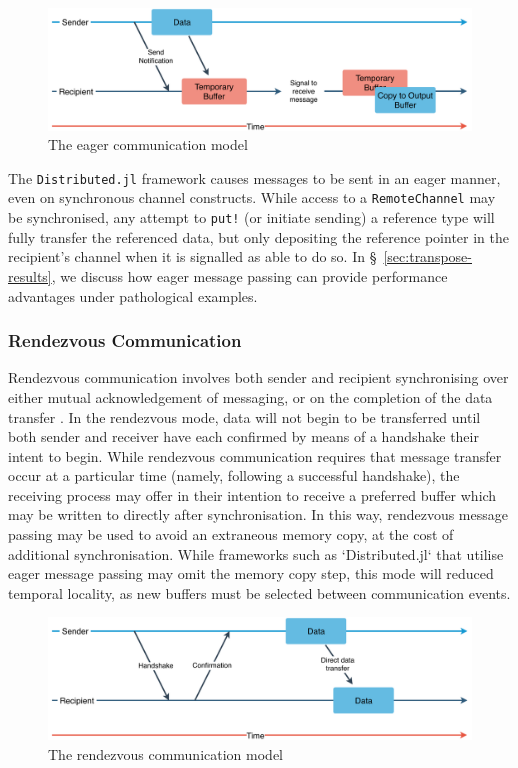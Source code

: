 \begin{figure}[htb]
  \includegraphics[width=\linewidth]{figs/Eager.pdf}
  \caption{The eager communication model}
  \label{fig:eager}
\end{figure}

The \texttt{Distributed.jl} framework causes messages to be sent in an
eager manner, even on synchronous channel constructs. While access to a
\texttt{RemoteChannel} may be synchronised, any attempt to \texttt{put!}
(or initiate sending) a reference type will fully transfer the
referenced data, but only depositing the reference pointer in the
recipient's channel when it is signalled as able to do so. In
\S~\ref{sec:transpose-results}, we discuss how eager message
passing can provide performance advantages under pathological examples.

\subsubsection{Rendezvous Communication}
\label{sec:rendezvous}

Rendezvous communication involves both sender and recipient
synchronising over either mutual acknowledgement of messaging, or on the
completion of the data transfer \cite{illinois, ompi}. In the rendezvous
mode, data will not begin to be transferred until both sender and
receiver have each confirmed by means of a handshake their intent to
begin. While rendezvous communication requires that message transfer
occur at a particular time (namely, following a successful handshake),
the receiving process may offer in their intention to receive a preferred
buffer which may be written to directly after synchronisation. In this
way, rendezvous message passing may be used to avoid an extraneous
memory copy, at the cost of additional synchronisation. While frameworks such as `Distributed.jl` that utilise eager message passing may omit the memory copy step, this mode will reduced temporal locality, as new buffers must be selected between communication events.

\begin{figure}[htb]
  \includegraphics[width=\linewidth]{figs/Rendezvous.pdf}
  \caption{The rendezvous communication model}
  \label{fig:rendezvous}
\end{figure}

